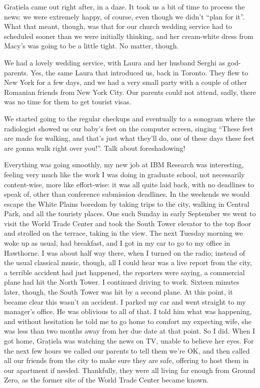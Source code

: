 \documentclass[12pt]{book}
\begin{document}
Grațiela came out right after, in a daze. It took us a bit of time to
process the news: we were extremely happy, of course, even though we
didn't ``plan for it''. What that meant, though, was that for our church
wedding service had to scheduled sooner than we were initially thinking,
and her cream-white dress from Macy's was going to be a little tight. No
matter, though.

We had a lovely wedding service, with Laura and her husband Serghi as
god-parents. Yes, the same Laura that introduced us, back in Toronto.
They flew to New York for a few days, and we had a very small party with
a couple of other Romanian friends from New York City. Our parents could
not attend, sadly, there was no time for them to get tourist visas.

We started going to the regular checkups and eventually to a sonogram
where the radiologist showed us our baby's feet on the computer screen,
singing ``These feet are made for walking, and that's just what they'll
do, one of these days these feet are gonna walk right over you!''. Talk
about foreshadowing!

Everything was going smoothly, my new job at IBM Research was
interesting, feeling very much like the work I was doing in graduate
school, not necessarily content-wise, more like effort-wise: it was all
quite laid back, with no deadlines to speak of, other than conference
submission deadlines. In the weekends we would escape the White Plains
boredom by taking trips to the city, walking in Central Park, and all
the touristy places. One such Sunday in early September we went to visit
the World Trade Center and took the South Tower elevator to the top
floor and strolled on the terrace, taking in the view. The next Tuesday
morning we woke up as usual, had breakfast, and I got in my car to go to
my office in Hawthorne. I was about half way there, when I turned on the
radio; instead of the usual classical music, though, all I could hear
was a live report from the city, a terrible accident had just happened,
the reporters were saying, a commercial plane had hit the North Tower. I
continued driving to work. Sixteen minutes later, though, the South
Tower was hit by a second plane. At this point, it became clear this
wasn't an accident. I parked my car and went straight to my manager's
office. He was oblivious to all of that. I told him what was happening,
and without hesitation he told me to go home to comfort my expecting
wife, she was less than two months away from her due date at that point.
So I did. When I got home, Grațiela was watching the news on TV, unable
to believe her eyes. For the next few hours we called our parents to
tell them we're OK, and then called all our friends from the city to
make sure they are safe, offering to host them in our apartment if
needed. Thankfully, they were all living far enough from Ground Zero, as
the former site of the World Trade Center became known.
\end{document}
